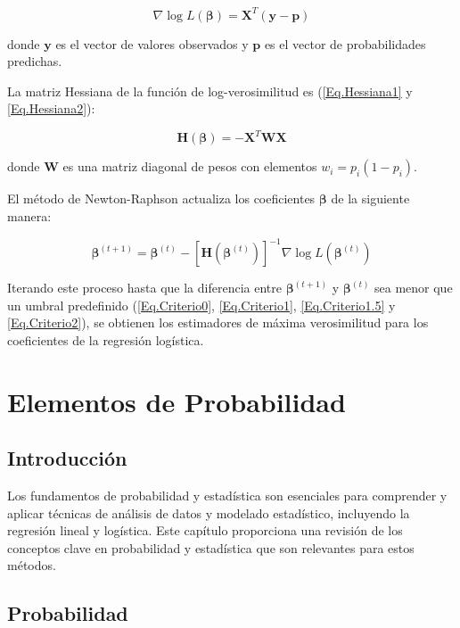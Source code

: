 \documentclass[a4paper]{report} %
\begin{document}
\begin{equation}
\nabla \log L(\boldsymbol{\beta}) = \mathbf{X}^T (\mathbf{y} - \mathbf{p})
\end{equation}

donde $\mathbf{y}$ es el vector de valores observados y $\mathbf{p}$ es el vector de probabilidades predichas.

La matriz Hessiana de la función de log-verosimilitud es (\ref{Eq.Hessiana1} y \ref{Eq.Hessiana2}):

\begin{equation}
\mathbf{H}(\boldsymbol{\beta}) = -\mathbf{X}^T \mathbf{W} \mathbf{X}
\end{equation}

donde $\mathbf{W}$ es una matriz diagonal de pesos con elementos $w_i = p_i (1 - p_i)$.

El método de Newton-Raphson actualiza los coeficientes $\boldsymbol{\beta}$ de la siguiente manera:

\begin{equation}\label{Eq.Criterio3}
\boldsymbol{\beta}^{(t+1)} = \boldsymbol{\beta}^{(t)} - [\mathbf{H}(\boldsymbol{\beta}^{(t)})]^{-1} \nabla \log L(\boldsymbol{\beta}^{(t)})
\end{equation}

Iterando este proceso hasta que la diferencia entre $\boldsymbol{\beta}^{(t+1)}$ y $\boldsymbol{\beta}^{(t)}$ sea menor que un umbral predefinido (\ref{Eq.Criterio0}, \ref{Eq.Criterio1}, \ref{Eq.Criterio1.5} y \ref{Eq.Criterio2}), se obtienen los estimadores de máxima verosimilitud para los coeficientes de la regresión logística.


\chapter{Elementos de Probabilidad}
\section{Introducci\'on}

Los fundamentos de probabilidad y estad\'istica son esenciales para comprender y aplicar t\'ecnicas de an\'alisis de datos y modelado estad\'istico, incluyendo la regresi\'on lineal y log\'istica. Este cap\'itulo proporciona una revisi\'on de los conceptos clave en probabilidad y estad\'istica que son relevantes para estos m\'etodos.

\section{Probabilidad}
\end{document}
